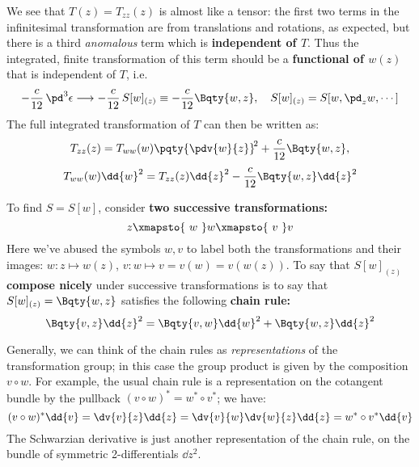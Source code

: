 \documentclass[a4paper
	,10pt
]{article}
\begin{document}
	We see that $T(z) = T_{zz}(z)$ is almost like a tensor: the first two terms in the infinitesimal transformation are from translations and rotations, as expected, but there is a third \textit{anomalous} term which is \textbf{independent of $T$}. Thus the integrated, finite transformation of this term should be a \textbf{functional of $w(z)$} that is independent of $T$, i.e.
	\begin{equation}
		- \frac{c}{12}\,\pd^3 \epsilon
	\longrightarrow
		- \frac{c}{12}\, S[w]_{(z)}
		\equiv - \frac{c}{12} \Bqty{w,z},
	\quad
		S[w]_{(z)} = S[w,\pd_z w,\cdots]
	\end{equation}
	The full integrated transformation of $T$ can then be written as:
	\begin{equation}
		T_{zz}(z)
		= T_{ww}(w) \pqty{\pdv{w}{z}}^{\!2}
			+ \frac{c}{12} \Bqty{w,z},
	\end{equation}
	\vspace{-.6\baselineskip}
	\begin{equation}
		T_{ww}(w) \dd{w}^2
		= T_{zz}(z) \dd{z}^2
			- \frac{c}{12} \Bqty{w,z} \dd{z}^2
	\end{equation}
	
	To find $S = S[w]$, consider \textbf{two successive transformations:}
	\begin{equation}
		z \xmapsto{\ w\ } w \xmapsto{\ v\ } v
	\end{equation}
	Here we've abused the symbols $w,v$ to label both the transformations and their images: $w\colon z\mapsto w(z)$, $v\colon w\mapsto v = v(w) = v(w(z))$. 
	To say that \textbf{$S[w]_{(z)}$ compose nicely} under successive transformations is to say that $S[w]_{(z)} = \Bqty{w,z}$ satisfies the following \textbf{chain rule:}
	\begin{equation}
		\Bqty{v,z} \dd{z}^2
		= \Bqty{v,w} \dd{w}^2
		+ \Bqty{w,z} \dd{z}^2
	\label{eq:schwarzian_chain}
	\end{equation}
	
	Generally, we can think of the chain rules as \textit{representations} of the transformation group; in this case the group product is given by the composition $v\circ w$. For example, the usual chain rule is a representation on the cotangent bundle by the pullback $
		(v\circ w)^*
		= w^* \circ v^*
	$; we have:
	\begin{equation}
		(v\circ w)^* \dd{v}
		= \dv{v}{z} \dd{z}
		= \dv{v}{w} \dv{w}{z} \dd{z}
		= w^* \circ v^* \dd{v}
	\end{equation}
	The Schwarzian derivative is just another representation of the chain rule, on the bundle of symmetric 2-differentials $\dd{z}^2$. 
	
\end{document}
